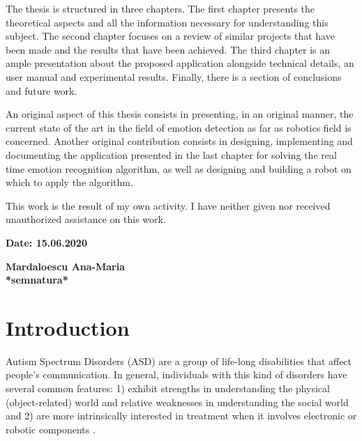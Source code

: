 \documentclass[runningheads,a4paper,12pt]{report}
\begin{document}
The thesis is structured in three chapters. The first chapter presents the theoretical aspects and all the information necessary for understanding this subject. The second chapter focuses on a review of similar projects that have been made and the results that have been achieved. The third chapter is an ample presentation about the proposed application alongside technical details, an user manual and experimental results. Finally, there is a section of conclusions and future work.  

An original aspect of this thesis consists in presenting, in an original manner, the current state of the art in the field of emotion detection as far as robotics field is concerned. Another original contribution consists in designing, implementing and documenting the application presented in the last chapter for solving the real time emotion recognition algorithm, as well as designing and building a robot on which to apply the algorithm.

This work is the result of my own activity. I have neither given nor received unauthorized assistance on this work. 

\vspace{2cm}

\begin{flushleft}
\textbf{Date: 15.06.2020}
\end{flushleft}

\begin{flushright}
\textbf{Mardaloescu Ana-Maria}\\
\textbf{*semnatura*}
\end{flushright}

\newpage

\listoffigures

\newpage

\chapter*{Introduction}
Autism Spectrum Disorders (ASD) are a group of life-long disabilities that affect people's communication.
In general, individuals with this kind of disorders have several common features: 1) exhibit strengths in understanding the physical (object-related) world and relative weaknesses in understanding the social world \cite{how-children-with-asd-behave} and 2) are more intrinsically interested in treatment when it involves electronic or robotic components \cite{android-social-skills}.
\end{document}
